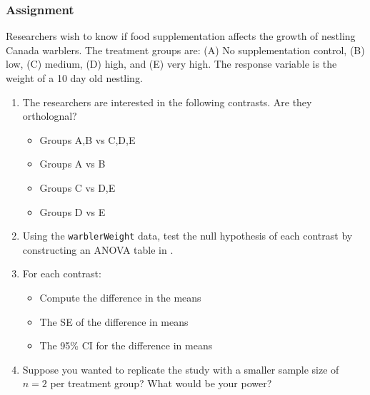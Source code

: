 \documentclass[color=usenames,dvipsnames]{beamer}\usepackage[]{graphicx}\usepackage[]{color}
\begin{document}
\begin{frame}
  \frametitle{Assignment}
  \footnotesize
  Researchers wish to know if food supplementation affects the growth
  of nestling Canada warblers. The treatment groups are: (A) No
  supplementation control, (B) low, (C) medium, (D) high, and (E) very
  high. The response variable is the weight of a 10 day old nestling.
  \begin{enumerate}[\bf (1)]
    \footnotesize
    \item<1-> The researchers are interested in the following
      contrasts. Are they ortholognal?
    \begin{itemize}
    \footnotesize
      \item Groups A,B vs C,D,E
      \item Groups A vs B
      \item Groups C vs D,E
      \item Groups D vs E
    \end{itemize}
    \item<2-> Using the {\tt warblerWeight} data, test the null
      hypothesis of each contrast by constructing an ANOVA table
       in \R.
    \item<3-> For each contrast:
      \begin{itemize}
        \footnotesize
        \item Compute the difference in the means
        \item The SE of the difference in means
        \item The 95\% CI for the difference in means
      \end{itemize}
    \item<4-> Suppose you wanted to replicate the study with a
      smaller sample size of $n=2$ per treatment group? What would be
      your power?
  \end{enumerate}

\end{frame}
\end{document}
